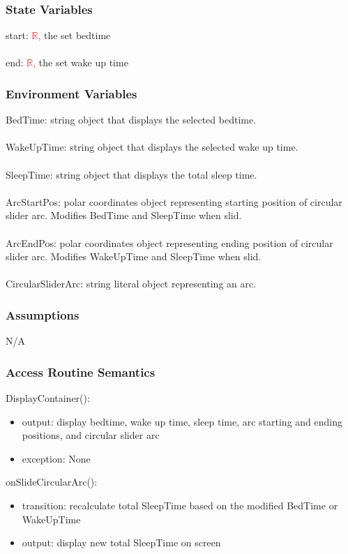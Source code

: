 \documentclass[12pt, titlepage]{article}
\begin{document}
\subsubsection{State Variables}
start: \textcolor{red}{\(\mathbb{R}\), } the set bedtime\\\\
end: \textcolor{red}{\(\mathbb{R}\), }the set wake up time

\subsubsection{Environment Variables}
BedTime: string object that displays the selected bedtime.\\\\
WakeUpTime: string object that displays the selected wake up time.\\\\
SleepTime: string object that displays the total sleep time.\\\\
ArcStartPos: polar coordinates object representing starting position of circular slider arc. Modifies BedTime and SleepTime when slid.\\\\
ArcEndPos: polar coordinates object representing ending position of circular slider arc. Modifies WakeUpTime and SleepTime when slid.\\\\
CircularSliderArc: string literal object representing an arc.
\subsubsection{Assumptions}

N/A

\subsubsection{Access Routine Semantics}

\noindent DisplayContainer():
\begin{itemize}
	\item output: display bedtime, wake up time, sleep time, arc starting and ending positions, and circular slider arc
	\item exception: None
\end{itemize}

\noindent onSlideCircularArc():
\begin{itemize}
	\item transition: recalculate total SleepTime based on the modified BedTime or WakeUpTime
	\item output: display new total SleepTime on screen
\end{itemize}
\end{document}
